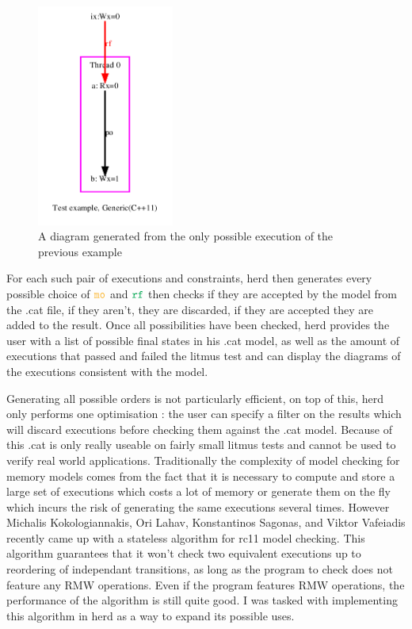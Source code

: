 \documentclass[a4,11pt]{article}
\newcommand{\mo}{\texttt{\color{Dandelion}mo}}
\newcommand{\rf}{\texttt{\color{Green}rf}}
\begin{document}
\begin{figure}
\includegraphics[width=4.5cm]{screen}
\caption{{\footnotesize{A diagram generated from the only possible execution of the previous example}}}
\end{figure}

 For each such pair of executions and constraints, herd then generates every possible choice of $\mo$ and $\rf$ then checks if they are accepted by the model from the .cat file, if they aren't, they are discarded, if they are accepted they are added to the result. Once all possibilities have been checked, herd provides the user with a list of possible final states in his .cat model, as well as the amount of executions that passed and failed the litmus test and can display the diagrams of the executions consistent with the model.




Generating all possible orders is not particularly efficient, on top of this, herd only performs one optimisation : the user can specify a filter on the results which will discard executions before checking them against the .cat model. Because of this .cat is only really useable on fairly small litmus tests and cannot be used to verify real world applications. Traditionally the complexity of model checking for memory models comes from the fact that it is necessary to compute and store a large set of executions which costs a lot of memory or generate them on the fly which incurs the risk of generating the same executions several times. However Michalis Kokologiannakis, Ori Lahav, Konstantinos Sagonas, and Viktor Vafeiadis recently came up with a stateless algorithm for rc11 model checking. This algorithm guarantees that it won't check two equivalent executions up to reordering of independant transitions, as long as the program to check does not feature any RMW operations. Even if the program features RMW operations, the performance of the algorithm is still quite good. I was tasked with implementing this algorithm in herd as a way to expand its possible uses.
\end{document}
